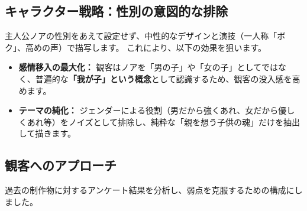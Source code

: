 \subsection{キャラクター戦略：性別の意図的な排除}
主人公ノアの性別をあえて設定せず、中性的なデザインと演技（一人称「ボク」、高めの声）で描写します。
これにより、以下の効果を狙います。
\begin{itemize}
    \item \textbf{感情移入の最大化：} 観客はノアを「男の子」や「女の子」としてではなく、普遍的な\textbf{「我が子」という概念}として認識するため、観客の没入感を高めます。
    \item \textbf{テーマの純化：} ジェンダーによる役割（男だから強くあれ、女だから優しくあれ等）をノイズとして排除し、純粋な「親を想う子供の魂」だけを抽出して描きます。
\end{itemize}

\subsection{観客へのアプローチ}
過去の制作物に対するアンケート結果を分析し、弱点を克服するための構成にしました。

